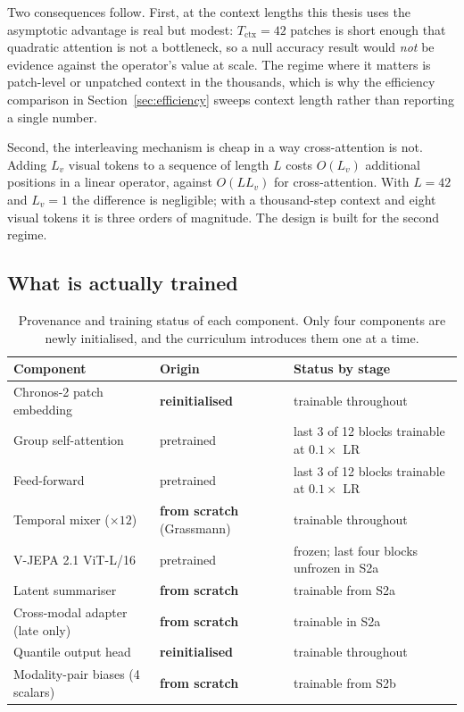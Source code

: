 Two consequences follow. First, at the context lengths this thesis uses the asymptotic
advantage is real but modest: $T_{\text{ctx}}=42$ patches is short enough that quadratic
attention is not a bottleneck, so a null accuracy result would \emph{not} be evidence against
the operator's value at scale. The regime where it matters is patch-level or unpatched
context in the thousands, which is why the efficiency comparison in
Section~\ref{sec:efficiency} sweeps context length rather than reporting a single number.

Second, the interleaving mechanism is cheap in a way cross-attention is not. Adding $L_v$
visual tokens to a sequence of length $L$ costs $O(L_v)$ additional positions in a linear
operator, against $O(L L_v)$ for cross-attention. With $L=42$ and $L_v=1$ the difference is
negligible; with a thousand-step context and eight visual tokens it is three orders of
magnitude. The design is built for the second regime.

\subsection{What is actually trained}

\begin{table}[h!]
\centering
\small
\begin{tabular}{l l l}
\hline
\textbf{Component} & \textbf{Origin} & \textbf{Status by stage} \\
\hline
Chronos-2 patch embedding & \textbf{reinitialised} & trainable throughout \\
Group self-attention & pretrained & last 3 of 12 blocks trainable at $0.1\times$ LR \\
Feed-forward & pretrained & last 3 of 12 blocks trainable at $0.1\times$ LR \\
Temporal mixer ($\times 12$) & \textbf{from scratch} (Grassmann) & trainable throughout \\
V-JEPA 2.1 ViT-L/16 & pretrained & frozen; last four blocks unfrozen in S2a \\
Latent summariser & \textbf{from scratch} & trainable from S2a \\
Cross-modal adapter (late only) & \textbf{from scratch} & trainable in S2a \\
Quantile output head & \textbf{reinitialised} & trainable throughout \\
Modality-pair biases (4 scalars) & \textbf{from scratch} & trainable from S2b \\
\hline
\end{tabular}
\caption{Provenance and training status of each component. Only four components are newly
initialised, and the curriculum introduces them one at a time.}
\label{tab:params}
\end{table}

